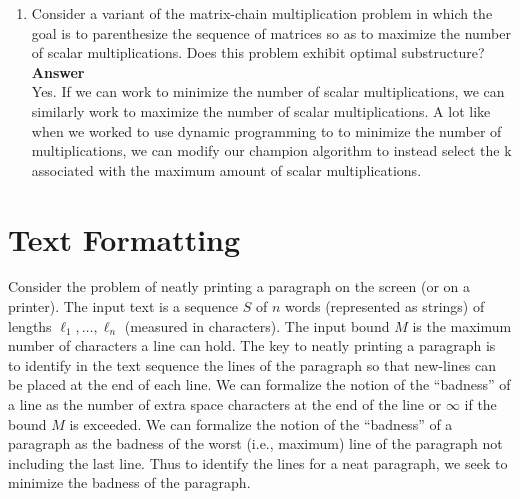 \documentclass[12pt]{article}%
\begin{document}
\begin{enumerate}[label=(\alph*)]
\textbf{Inductive Step:}\\
Assume proposition is true for all n, show that n+1 follows.\\
\begin{addmargin}[6em]{2em}%
$LHS = T(n + 1) =  2\sum_{i=1}^{n + 1 -1} T(i) + n + 1$\\
$= 2(1.4(3.5)^n - 1.4) + n +  1$\textsl{By I.H}\\
$= 2.8(3.5)^n - 1.8 + n$\\
$RHS = 3.5^{n+ 1}$\\
$LHS \leq RHS$ \textsl{For sufficiently large n}\\
$\Box$\\
\end{addmargin}

\textbf{Corollary 1:}
By lemma 1; T(n) is $O(3.5^n)$\\

Since enumerations runs in $\Omega(\frac{4^n}{n^\frac{3}{2}})$ and the recursive solution runs in 
$O(3.5^n)$, the RECURSIVE-MATRIX-CHAIN is asomtotically faster. 
    \item Consider a variant of the matrix-chain multiplication problem in which the goal is to parenthesize the sequence of matrices so as to maximize the number of scalar multiplications. Does this problem exhibit optimal substructure?\\
    
\textbf{Answer}\\
Yes. If we can work to minimize the number of scalar multiplications, we can similarly work to maximize the number of scalar multiplications. A lot like when we worked to use dynamic programming to to minimize the number of multiplications, we can modify our champion algorithm to instead select the k associated with the maximum amount of scalar multiplications.

\end{enumerate}

\section{Text Formatting}

Consider the problem of neatly printing a paragraph on the
  screen (or on a printer).  The input text is a sequence $S$ of $n$
  words (represented as strings) of lengths $\ell_1, \ldots, \ell_n $
  (measured in characters). The input bound $M$ is the maximum number
  of characters a line can hold.  The key to neatly printing a
  paragraph is to identify in the text sequence the lines of the
  paragraph so that new-lines can be placed at the end of each line.
  We can formalize the notion of the ``badness'' of a line as the
  number of extra space characters at the end of the line or $\infty$
  if the bound $M$ is exceeded.  We can formalize the notion of the
  ``badness'' of a paragraph as the badness of the worst (i.e.,
  maximum) line of the paragraph not including the last line.  Thus to
  identify the lines for a neat paragraph, we seek to minimize the
  badness of the paragraph.
\end{document}
